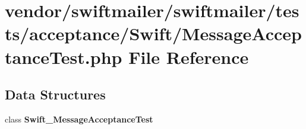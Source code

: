 \section{vendor/swiftmailer/swiftmailer/tests/acceptance/\+Swift/\+Message\+Acceptance\+Test.php File Reference}
\label{_message_acceptance_test_8php}
\subsection*{Data Structures}
\begin{DoxyCompactItemize}
\item 
class {\bf Swift\+\_\+\+Message\+Acceptance\+Test}
\end{DoxyCompactItemize}
